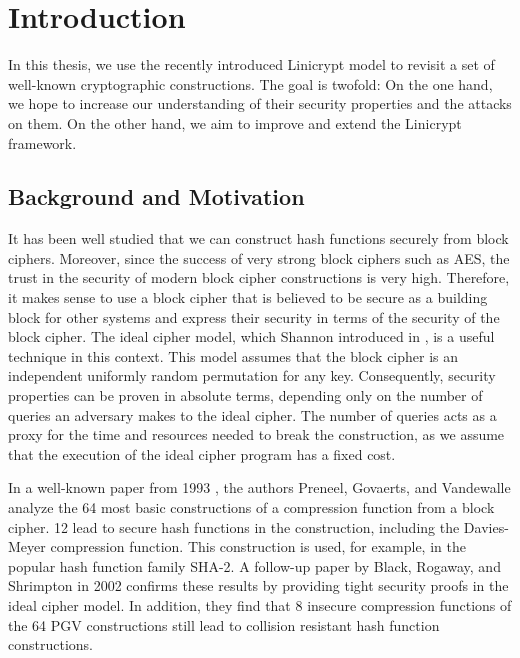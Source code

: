 \chapter{Introduction}

In this thesis, we use the recently introduced Linicrypt model to revisit a set of well-known cryptographic constructions.
The goal is twofold:
On the one hand, we hope to increase our understanding of their security properties and the attacks on them.
On the other hand, we aim to improve and extend the Linicrypt framework.

\section{Background and Motivation}

It has been well studied that we can construct hash functions securely from block ciphers.
Moreover, since the success of very strong block ciphers such as AES, 
the trust in the security of modern block cipher constructions is very high.
Therefore, it makes sense to use a block cipher that is believed to be secure as a building block for other systems
and express their security in terms of the security of the block cipher.
The ideal cipher model, which Shannon introduced in \cite{Shannon49},
is a useful technique in this context.
This model assumes that the block cipher is an independent uniformly random permutation for any key.
Consequently, security properties can be proven in absolute terms, depending only on the number of queries an adversary makes to the ideal cipher.
The number of queries acts as a proxy for the time and resources needed to break the construction,
as we assume that the execution of the ideal cipher program has a fixed cost.

In a well-known paper from 1993 \cite{C:PreGovVan93}, the authors Preneel, Govaerts, and Vandewalle analyze the 64 most basic constructions of a compression function from a block cipher.
12 lead to secure hash functions in the \MD construction, including the Davies-Meyer compression function.
This construction is used, for example, in the popular hash function family SHA-2.
A follow-up paper by Black, Rogaway, and Shrimpton \cite{C:BlaRogShr02} in 2002 confirms these results
by providing tight security proofs in the ideal cipher model.
In addition, 
they find that 8 insecure compression functions of the 64 PGV constructions still lead to collision resistant \MD hash function constructions.

